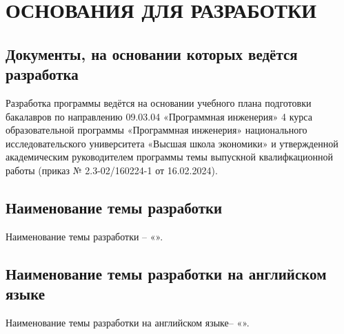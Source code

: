 \section{ОСНОВАНИЯ ДЛЯ РАЗРАБОТКИ}

\subsection{Документы, на основании которых ведётся разработка}
    Разработка программы ведётся на основании учебного плана подготовки бакалавров по направлению 09.03.04 «Программная инженерия» 4 курса образовательной программы «Программная инженерия» национального исследовательского университета «Высшая школа экономики» и утвержденной академическим руководителем программы темы выпускной квалифкационной работы (приказ № 2.3-02/160224-1 от 16.02.2024).

\subsection{Наименование темы разработки}
    Наименование темы разработки – «\docTitle».

\subsection{Наименование темы разработки на английском языке}
    Наименование темы разработки на английском языке– «\docTitleEng».

\clearpage